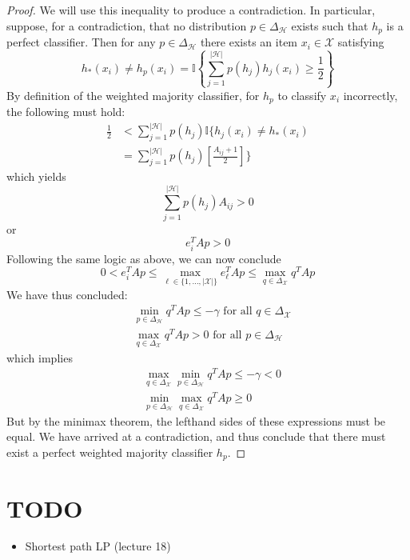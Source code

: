 \documentclass[12pt]{article}
\newcommand*{\abs}[1]{\left\lvert#1\right\rvert}
\begin{document}
\begin{proof}
We will use this inequality to produce a contradiction. In particular, 
suppose, for a contradiction, that no distribution $p \in \Delta_{\mathcal{H}}$ exists such that $h_p$ is a perfect classifier. Then for any $p \in \Delta_{\mathcal{H}}$ there exists an item $x_i \in \mathcal{X}$ satisfying 
\[h_*(x_i) \neq h_p(x_i) = \mathbb{I}\left\{\sum_{j = 1}^{\abs{\mathcal{H}}} p(h_j)h_j(x_i) \geq \frac{1}{2}\right\}\]
By definition of the weighted majority classifier, for $h_p$ to classify $x_i$ incorrectly, the following must hold: 
\begin{align*}
\frac{1}{2} &< \sum_{j = 1}^{\abs{\mathcal{H}}} p(h_j) \mathbb{I}\{h_j(x_i) \neq h_*(x_i) \\
		&= \sum_{j = 1}^{\abs{\mathcal{H}}} p(h_j) \left[\frac{A_{ij} + 1}{2}\right]\}
\end{align*}
which yields
\[\sum_{j = 1}^{\abs{\mathcal{H}}} p(h_j) A_{ij} > 0\]
or 
\[e_i^T A p > 0\]
Following the same logic as above, we can now conclude
\[0 < e_i^T A p \leq \max_{\ell \in \{1, \dots, \abs{\mathcal{X}}\}} e_\ell^T A p \leq \max_{q \in \Delta_{\mathcal{X}}} q^T A p\]
We have thus concluded: 
\begin{align*}
&\min_{p \in \Delta_{\mathcal{H}}} q^T A p \leq -\gamma \text{ for all } q \in \Delta_{\mathcal{X}} \\
&\max_{q \in \Delta_{\mathcal{X}}} q^T A p > 0 \text{ for all } p \in \Delta_{\mathcal{H}}
\end{align*}
which implies
\begin{align*}
& \max_{q \in \Delta_{\mathcal{X}}} \min_{p \in \Delta_{\mathcal{H}}} q^T A p \leq -\gamma < 0 \\
&\min_{p \in \Delta_{\mathcal{H}}} \max_{q \in \Delta_{\mathcal{X}}} q^T A p \geq 0
\end{align*}
But by the minimax theorem, the lefthand sides of these expressions must be equal. We have arrived at a contradiction, and thus conclude that there must exist a perfect 
weighted majority classifier $h_p$. 
\end{proof}

	
\section{TODO}
\begin{itemize}
\item Shortest path LP (lecture 18)
\end{itemize}
	
	
\end{document}
